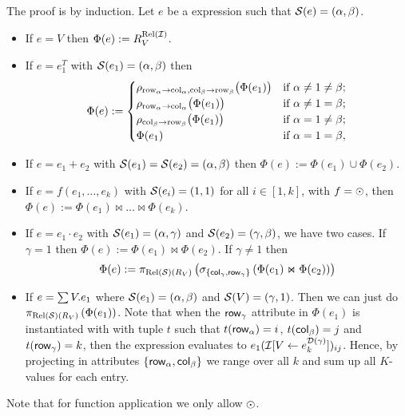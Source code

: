 The proof is by induction. Let $e$ be a \langsum expression such that $\mathcal{S} (e)=(\alpha, \beta)$.
\begin{itemize}
  \item If $e=V$ then $\Phi (e):=R_V^{\text{Rel}(\mathcal{I})}$.

  \item If $e=e_1^T$ with $\mathcal{S} (e_1)=(\alpha, \beta)$ then \[
\Phi(e) :=
\begin{cases}
\rho_{\mathrm{row}_\alpha \to \mathrm{col}_\alpha,\mathrm{col}_\beta \to \mathrm{row}_\beta}\bigl(\Phi(e_1)\bigr) & \text{if } \alpha \neq 1 \neq \beta; \cr
\rho_{\mathrm{row}_\alpha \to \mathrm{col}_\alpha}\bigl(\Phi(e_1)\bigr) & \text{if } \alpha \neq 1 = \beta; \cr
\rho_{\mathrm{col}_\beta \to \mathrm{row}_\beta}\bigl(\Phi(e_1)\bigr) & \text{if } \alpha = 1 \neq \beta; \cr
\Phi(e_1) & \text{if } \alpha = 1 = \beta,
\end{cases}
\]

  \item If $e=e_1+e_2$ with $\mathcal{S} (e_1)=\mathcal{S} (e_2)=(\alpha, \beta)$ then $\Phi (e):=\Phi (e_1)\cup \Phi (e_2)$.

  \item If $e=f(e_1,\ldots, e_k)$ with $\mathcal{S}(e_i)=(1,1)$ for all $i\in[1,k]$, with $f=\odot$, then $\Phi(e):=\Phi(e_1)\Join \ldots \Join\Phi(e_k)$.

  \item If $e=e_1\cdot e_2$ with $\mathcal{S} (e_1)=(\alpha, \gamma)$ and $\mathcal{S} (e_2)=(\gamma, \beta)$, we have two cases. If $\gamma = 1$ then $\Phi (e):=\Phi (e_1)\Join \Phi (e_2)$.
If $\gamma\neq 1$ then
$$
\Phi (e) := \pi_{\text{Rel}(\mathcal{S})(R_V)}\left( \sigma_{\lbrace \mathsf{col}_\gamma, \mathsf{row}_\gamma \rbrace} \left( \Phi (e_1)\Join \Phi (e_2) \right) \right)
$$

  \item If $e=\textstyle\sum V. e_1$ where $\mathcal{S}(e_1)=(\alpha,\beta)$ and $\mathcal{S}(V)=(\gamma,1)$. Then we can just do $\pi_{\text{Rel}(\mathcal{S})(R_V)}\left( \Phi (e_1) \right)$.
Note that when the $\mathsf{row}_\gamma$ attribute in $\Phi (e_1)$ is instantiated with with tuple $t$ such that $t(\mathsf{row}_\alpha)=i$, $t(\mathsf{col}_\beta)=j$ and $t(\mathsf{row}_\gamma)=k$,
then the expression evaluates to $e_1(\mathcal{I} [V\leftarrow e_{k}^{\mathcal{D}(\gamma)}])_{ij}$. 
Hence, by projecting in attributes $\lbrace \mathsf{row}_\alpha, \mathsf{col}_\beta\rbrace$ we range over all $k$ and sum up all $K$-values for each entry.
\end{itemize}

Note that for function application we only allow $\odot$.

